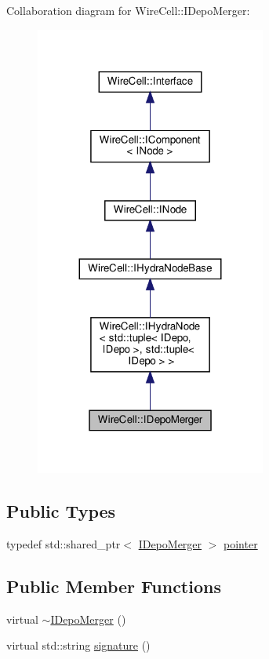 Collaboration diagram for Wire\+Cell\+:\+:I\+Depo\+Merger\+:
\nopagebreak
\begin{figure}[H]
\begin{center}
\leavevmode
\includegraphics[width=215pt]{class_wire_cell_1_1_i_depo_merger__coll__graph}
\end{center}
\end{figure}
\subsection*{Public Types}
\begin{DoxyCompactItemize}
\item 
typedef std\+::shared\+\_\+ptr$<$ \hyperlink{class_wire_cell_1_1_i_depo_merger}{I\+Depo\+Merger} $>$ \hyperlink{class_wire_cell_1_1_i_depo_merger_a7d2c27e09807420de446264e3e595b06}{pointer}
\end{DoxyCompactItemize}
\subsection*{Public Member Functions}
\begin{DoxyCompactItemize}
\item 
virtual \hyperlink{class_wire_cell_1_1_i_depo_merger_a91f686433e29d6b681943941ab2ce0d5}{$\sim$\+I\+Depo\+Merger} ()
\item 
virtual std\+::string \hyperlink{class_wire_cell_1_1_i_depo_merger_a8a14876da574b0a8ef6989e145188843}{signature} ()
\end{DoxyCompactItemize}



